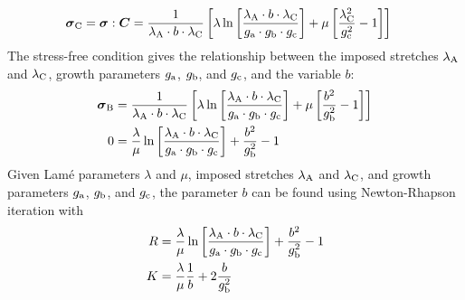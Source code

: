 \documentclass[10pt,letterpaper,oneside]{report}
\newcommand{\ten}[1]{\mbox{\boldmath $#1$}{}}
\newcommand{\scas}[1]{\mbox{{\scriptsize{${\rm{#1}}$}}}{}}
\begin{document}
\begin{itemize}
\begin{align}
\\
\ten{\sigma}_{\scas{C}} &= \ten{\sigma} : \ten{C} = \frac{1}{\lambda_{\scas{A}} \cdot b \cdot \lambda_{\scas{C}}} \left[ \lambda \ln \left[ \frac{\lambda_{\scas{A}} \cdot b \cdot \lambda_{\scas{C}} }{g_{\scas{a}} \cdot g_{\scas{b}} \cdot g_{\scas{c}}} \right] + \mu \left[ \frac{\lambda_{\scas{C}}^2}{g_{\scas{c}}^2} - 1 \right] \right] 
\end{align}
The stress-free condition gives the relationship between the imposed stretches $\lambda_{\scas{A}}$ and $\lambda_{\scas{C}}$, growth parameters $g_{\scas{a}}$, $g_{\scas{b}}$, and $g_{\scas{c}}$, and the variable $b$:
\begin{align}
\ten{\sigma}_{\scas{B}} &= \frac{1}{\lambda_{\scas{A}} \cdot b \cdot \lambda_{\scas{C}}} \left[ \lambda \ln \left[ \frac{\lambda_{\scas{A}} \cdot b \cdot \lambda_{\scas{C}} }{g_{\scas{a}} \cdot g_{\scas{b}} \cdot g_{\scas{c}}} \right] + \mu \left[ \frac{b^2}{g_{\scas{b}}^2} - 1 \right] \right] \\
0 &= \frac{\lambda}{\mu} \ln \left[ \frac{\lambda_{\scas{A}} \cdot b \cdot \lambda_{\scas{C}} }{g_{\scas{a}} \cdot g_{\scas{b}} \cdot g_{\scas{c}}} \right] + \frac{b^2}{g_{\scas{b}}^2} - 1 
\end{align}
Given Lamé parameters $\lambda$ and $\mu$, imposed stretches $\lambda_{\scas{A}}$ and $\lambda_{\scas{C}}$, and growth parameters $g_{\scas{a}}$, $g_{\scas{b}}$, and $g_{\scas{c}}$, the parameter $b$ can be found using Newton-Rhapson iteration with 
\begin{align}
R &= \frac{\lambda}{\mu} \ln \left[ \frac{\lambda_{\scas{A}} \cdot b \cdot \lambda_{\scas{C}} }{g_{\scas{a}} \cdot g_{\scas{b}} \cdot g_{\scas{c}}} \right] + \frac{b^2}{g_{\scas{b}}^2} - 1 \\
K &= \frac{\lambda}{\mu} \frac{1}{b} + 2 \frac{b}{g_{\scas{b}}^2}
\end{align}


\end{itemize}
\end{document}
